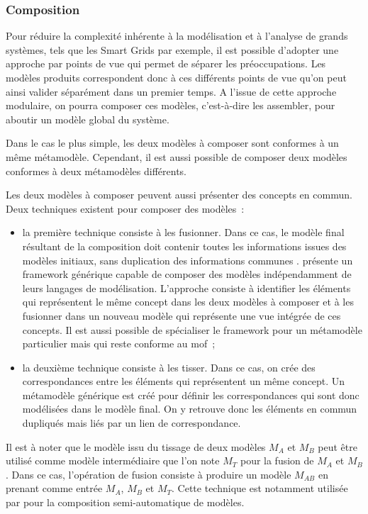 \subsubsection{Composition}

Pour réduire la complexité inhérente à la modélisation et à l'analyse de grands 
systèmes, tels que les Smart Grids par exemple, il est possible d'adopter une 
approche par points de vue qui permet de séparer les préoccupations. Les modèles 
produits correspondent donc à ces différents points de vue qu'on peut ainsi 
valider séparément dans un premier temps. A l'issue de cette approche modulaire, 
on pourra composer ces modèles, c'est-à-dire les assembler, pour aboutir un 
modèle global du système.

Dans le cas le plus simple, les deux modèles à composer sont conformes à un même 
métamodèle. Cependant, il est aussi possible de composer deux modèles conformes 
à deux métamodèles différents. 

Les deux modèles à composer peuvent aussi présenter des concepts en commun. Deux 
techniques existent pour composer des modèles~:

\begin{itemize}
\item la première technique consiste à les fusionner. Dans ce cas, le modèle 
final résultant de la composition doit contenir toutes les informations issues 
des modèles initiaux, sans duplication des informations communes 
\cite{bezivin2006canonical}.
\cite{fleurey2008generic} présente un framework générique capable de composer 
des modèles indépendamment de leurs langages de modélisation. L'approche 
consiste à identifier les éléments qui représentent le même concept dans les 
deux modèles à composer et à les fusionner dans un nouveau modèle qui représente 
une vue intégrée de ces concepts. Il est aussi possible de spécialiser le 
framework pour un métamodèle particulier mais qui reste conforme au \gls{mof}~;

\item la deuxième technique consiste à les tisser. Dans ce cas, on crée des 
correspondances entre les éléments qui représentent un même concept. Un 
métamodèle générique est créé pour définir les correspondances qui sont donc 
modélisées dans le modèle final. On y retrouve donc les éléments en commun 
dupliqués mais liés par un lien de correspondance. 
\end{itemize}

Il est à noter que le modèle issu du tissage de deux modèles $M_{A}$ et $M_{B}$ 
peut être utilisé comme modèle intermédiaire que l'on note $M_{T}$ pour la 
fusion de $M_{A}$ et $M_{B}$. Dans ce cas, l'opération de fusion consiste à 
produire un modèle $M_{AB}$ en prenant comme entrée $M_{A}$, $M_{B}$ et $M_{T}$. 
Cette technique est notamment utilisée par \cite{del2007semi} pour la 
composition semi-automatique de modèles.

